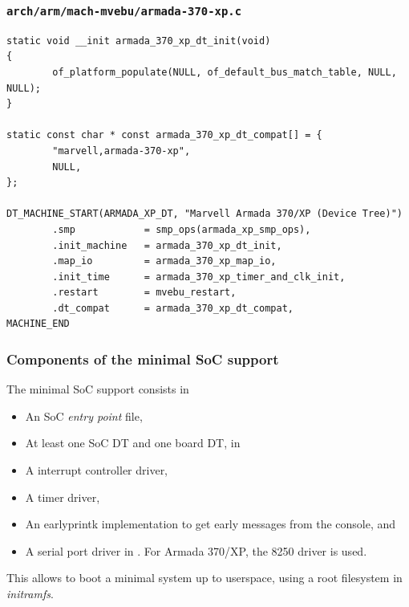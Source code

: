 \begin{frame}[fragile]
  \frametitle{{\tt arch/arm/mach-mvebu/armada-370-xp.c}}
  \begin{block}{}
    \begin{verbatim}
static void __init armada_370_xp_dt_init(void)
{
        of_platform_populate(NULL, of_default_bus_match_table, NULL, NULL);
}

static const char * const armada_370_xp_dt_compat[] = {
        "marvell,armada-370-xp",
        NULL,
};

DT_MACHINE_START(ARMADA_XP_DT, "Marvell Armada 370/XP (Device Tree)")
        .smp            = smp_ops(armada_xp_smp_ops),
        .init_machine   = armada_370_xp_dt_init,
        .map_io         = armada_370_xp_map_io,
        .init_time      = armada_370_xp_timer_and_clk_init,
        .restart        = mvebu_restart,
        .dt_compat      = armada_370_xp_dt_compat,
MACHINE_END
  \end{verbatim}
 \end{block}
\end{frame}

\begin{frame}
  \frametitle{Components of the minimal SoC support}
  The minimal SoC support consists in
  \footnotesize
  \begin{itemize}
  \item An SoC {\em entry point} file,
  \item At least one SoC  DT and one board  DT,
    in 
  \item A interrupt controller driver,
  \item A timer driver,
  \item An earlyprintk implementation to get early messages from the
    console,  and
  \item A serial port driver in . For Armada
    370/XP, the 8250 driver  is used.
  \end{itemize}
  \normalsize
  This allows to boot a minimal system up to userspace, using a root
  filesystem in {\em initramfs}.
\end{frame}

